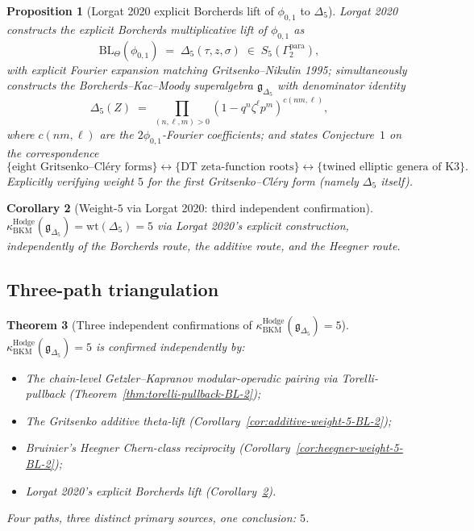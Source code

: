 \documentclass[11pt]{article}
\newtheorem{theorem}{Theorem}[section]
\newtheorem{proposition}[theorem]{Proposition}
\newtheorem{corollary}[theorem]{Corollary}
\providecommand{\fg}{\mathfrak{g}}
\providecommand{\kHodge}{\kappa_{\mathrm{BKM}}^{\mathrm{Hodge}}}
\begin{document}
\begin{proposition}[Lorgat 2020 explicit Borcherds lift of $\phi_{0, 1}$ to $\Delta_5$]
\label{prop:lorgat-2020-BL-2}
Lorgat 2020 constructs the explicit Borcherds multiplicative lift of
$\phi_{0, 1}$ as
\[
  \mathrm{BL}_\Theta(\phi_{0, 1})
  \;=\; \Delta_5(\tau, z, \sigma)
  \;\in\; S_5(\Gamma_2^{\mathrm{para}}),
\]
with explicit Fourier expansion matching Gritsenko--Nikulin 1995;
simultaneously constructs the Borcherds--Kac--Moody superalgebra
$\fg_{\Delta_5}$ with denominator identity
\[
  \Delta_5(Z)
  \;=\; \prod_{(n, \ell, m) > 0}
    (1 - q^n \zeta^\ell p^m)^{c(nm, \ell)},
\]
where $c(nm, \ell)$ are the $2\phi_{0, 1}$-Fourier coefficients;
and states Conjecture~$1$ on the correspondence
\[
  \{\text{eight Gritsenko--Cl\'ery forms}\}
  \longleftrightarrow
  \{\text{DT zeta-function roots}\}
  \longleftrightarrow
  \{\text{twined elliptic genera of K3}\}.
\]
Explicitly verifying weight $5$ for the first Gritsenko--Cl\'ery form
(namely $\Delta_5$ itself).
\end{proposition}

\begin{corollary}[Weight-$5$ via Lorgat 2020: third independent confirmation]
\label{cor:lorgat-weight-5-BL-2}
$\kHodge(\fg_{\Delta_5}) = \mathrm{wt}(\Delta_5) = 5$ via Lorgat
2020's explicit construction, independently of the Borcherds route,
the additive route, and the Heegner route.
\end{corollary}

\subsection{Three-path triangulation}

\begin{theorem}[Three independent confirmations of $\kHodge(\fg_{\Delta_5}) = 5$]
\label{thm:triangulation-BL-2}
$\kHodge(\fg_{\Delta_5}) = 5$ is confirmed independently by:
\begin{itemize}
\item[\textup{(i)}] The chain-level Getzler--Kapranov modular-operadic
pairing via Torelli-pullback (Theorem~\ref{thm:torelli-pullback-BL-2});
\item[\textup{(ii)}] The Gritsenko additive theta-lift (Corollary~\ref{cor:additive-weight-5-BL-2});
\item[\textup{(iii)}] Bruinier's Heegner Chern-class reciprocity
(Corollary~\ref{cor:heegner-weight-5-BL-2});
\item[\textup{(iv)}] Lorgat 2020's explicit Borcherds lift
(Corollary~\ref{cor:lorgat-weight-5-BL-2}).
\end{itemize}
Four paths, three distinct primary sources, one conclusion: $5$.
\end{theorem}
\end{document}
